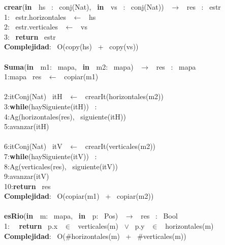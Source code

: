 \noindent \makebox[\linewidth]{\rule{\textwidth}{0.4pt}}
\begin{Algoritmos}
    
\noindent \noindent\makebox[\linewidth]{\rule{\textwidth}{0.4pt}}
\textbf{crear}(\textbf{in \ }hs \ : \ conj(Nat), \ \textbf{in \ }vs \ : \ conj(Nat)) \ $\longrightarrow$ \ res \ : \ estr\\
1: \ estr.horizontales \ $\leftarrow$ \ hs\\
2: \ estr.verticales \ $\leftarrow$ \ vs \ \\
3: \ \textbf{return} \ estr\\
\textbf{Complejidad}: \ O(copy(hs) \ + \ copy(vs))\\
\makebox[\linewidth]{\rule{\textwidth}{0.4pt}}
\\
\makebox[\linewidth]{\rule{\textwidth}{0.4pt}}
\textbf{Suma}(\textbf{in \ }m1: \ mapa, \ \textbf{in \ }m2: \ mapa) \ $\longrightarrow$ \ res \ : \ mapa\\
1:\indent mapa \ res \ $\leftarrow$ \ copiar(m1)\\
\\
2:\indent itConj(Nat) \ itH \ $\leftarrow$ \ crearIt(horizontales(m2))\\
3:\indent \textbf{while}(haySiguiente(itH)) \ :\\
4:\indent \indent Ag(horizontales(res), \ siguiente(itH))\\
5:\indent \indent avanzar(itH)\\
\\
6:\indent itConj(Nat) \ itV \ $\leftarrow$ \ crearIt(verticales(m2))\\
7:\indent \textbf{while}(haySiguiente(itV)) \ :\\
8:\indent \indent Ag(verticales(res), \ siguiente(itV))\\
9:\indent \indent avanzar(itV)\\
10:\indent \textbf{return} \ res\\
\textbf{Complejidad}: \ O(copiar(m1) \ + \ copiar(m2))\\
\makebox[\linewidth]{\rule{\textwidth}{0.4pt}}
\\
\makebox[\linewidth]{\rule{\textwidth}{0.4pt}}
\textbf{esRio}(\textbf{in \ }m: \ mapa, \ \textbf{in \ }p: \ Pos) \ $\longrightarrow$ \ res \ : \ Bool\\
1: \  \ \textbf{return} \ p.x \ $\in$ \ verticales(m) \ $\vee$ \ p.y \ $\in$ \ horizontales(m)\\
\textbf{Complejidad}: \ O($ \# $horizontales(m) \ + \ $ \# $verticales(m))\\

\end{Algoritmos}
